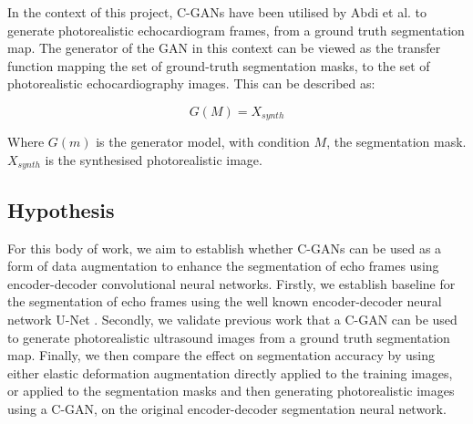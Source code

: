In the context of this project, C-GANs have been utilised by Abdi et al.
\cite{abdiGANenhancedConditionalEchocardiogram2019} to generate photorealistic
echocardiogram frames, from a ground truth segmentation map. The generator of
the GAN in this context can be viewed as the transfer function mapping the set of
ground-truth segmentation masks, to the set of photorealistic echocardiography
images. This can be described as: \newline

\begin{equation}
    G(M) = X_{synth}
\end{equation} \newline

Where $G(m)$ is the generator model, with condition $M$, the segmentation mask.
$X_{synth}$ is the synthesised photorealistic image.\newline 

\subsection{Hypothesis}

For this body of work, we aim to establish whether C-GANs can be used as a form
of data augmentation to enhance the segmentation of echo frames using
encoder-decoder convolutional neural networks. Firstly, we establish baseline
for the segmentation of echo frames using the well known encoder-decoder neural
network U-Net \cite{ronneberger2015u}. Secondly, we validate previous work that
a C-GAN can be used to generate photorealistic ultrasound images from a ground
truth segmentation map. Finally, we then compare the effect on segmentation
accuracy by using either elastic deformation augmentation directly applied to
the training images, or applied to the segmentation masks and then generating
photorealistic images using a C-GAN, on the original encoder-decoder
segmentation neural network. \newline
